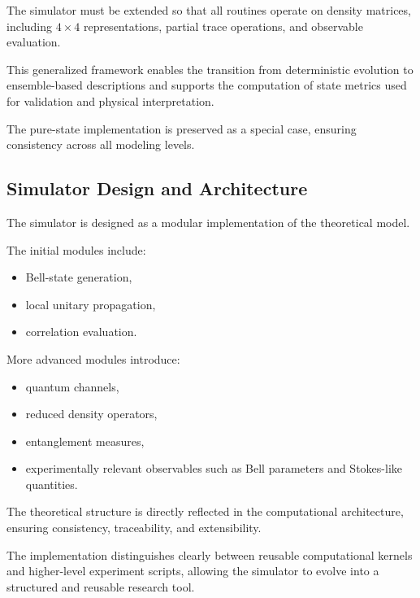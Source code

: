 \documentclass[a4paper]{article}
\begin{document}
The simulator must be extended so that all routines operate on density matrices, including \( 4 \times 4 \) representations, partial trace operations, and observable evaluation.

This generalized framework enables the transition from deterministic evolution to ensemble-based descriptions and supports the computation of state metrics used for validation and physical interpretation.

The pure-state implementation is preserved as a special case, ensuring consistency across all modeling levels.


\subsection{Simulator Design and Architecture}

The simulator is designed as a modular implementation of the theoretical model.

\medskip

The initial modules include:
\begin{itemize}
\item Bell-state generation,
\item local unitary propagation,
\item correlation evaluation.
\end{itemize}

\medskip

More advanced modules introduce:
\begin{itemize}
\item quantum channels,
\item reduced density operators,
\item entanglement measures,
\item experimentally relevant observables such as Bell parameters and Stokes-like quantities.
\end{itemize}

\medskip

The theoretical structure is directly reflected in the computational architecture, ensuring consistency, traceability, and extensibility.

The implementation distinguishes clearly between reusable computational kernels and higher-level experiment scripts, allowing the simulator to evolve into a structured and reusable research tool.
\end{document}
